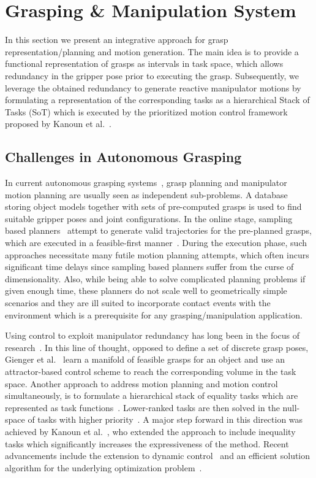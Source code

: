 
\section{Grasping \& Manipulation System}
\label{sec:manip}
%
In this section we present an integrative approach for grasp representation/planning and motion
generation. The main idea is to provide a functional representation of grasps as intervals in task
space, which allows redundancy in the gripper pose prior to executing the grasp. Subsequently, we
leverage the obtained redundancy to generate reactive manipulator motions by formulating a
representation of the corresponding tasks as a hierarchical Stack of Tasks (SoT) which is executed
by the prioritized motion control framework proposed by Kanoun et al.~\cite{Kano11}.
%
\subsection{Challenges in Autonomous Grasping}
\label{subsec:Grasping_challenges}
%
In current autonomous grasping systems~\cite{Bere07, Srin10, Krug14a}, grasp planning and
manipulator motion planning are usually seen as independent sub-problems. A database storing object
models together with sets of pre-computed grasps is used to find suitable gripper poses and joint
configurations. In the online stage, sampling based planners~\cite{LaVa06} attempt to generate valid
trajectories for the pre-planned grasps, which are executed in a feasible-first
manner~\cite{Bere07}. During the execution phase, such approaches necessitate many futile motion
planning attempts, which often incurs significant time delays since sampling based planners suffer
from the curse of dimensionality. Also, while being able to solve complicated planning problems if
given enough time, these planners do not scale well to geometrically simple scenarios and they are
ill suited to incorporate contact events with the environment which is a prerequisite for any
grasping/manipulation application.

Using control to exploit manipulator redundancy has long been in the focus of research~\cite{Sici91,
  Sent10}. In this line of thought, opposed to define a set of discrete grasp poses, Gienger et
al.~\cite{Gien08a, Gien08b} learn a manifold of feasible grasps for an object and use an
attractor-based control scheme to reach the corresponding volume in the task space. Another approach
to address motion planning and motion control simultaneously, is to formulate a hierarchical stack
of equality tasks which are represented as task functions~\cite{Sams91}. Lower-ranked tasks are then
solved in the null-space of tasks with higher priority~\cite{Sici91, Sent10}. A major step forward
in this direction was achieved by Kanoun et al.~\cite{Kano11}, who extended the approach to include
inequality tasks which significantly increases the expressiveness of the method. Recent advancements
include the extension to dynamic control~\cite{Saab13} and an efficient solution algorithm for the
underlying optimization problem~\cite{Esca14}.
%
